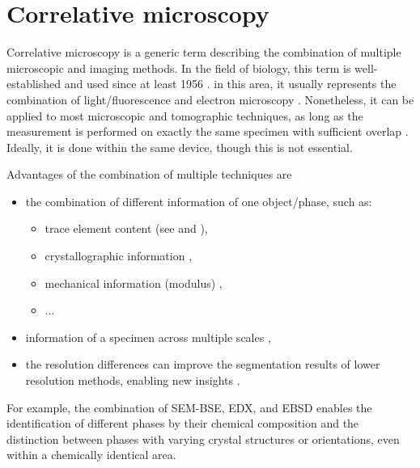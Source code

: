 \FloatBarrier
\section{Correlative microscopy}

Correlative microscopy is a generic term describing the combination of multiple microscopic and imaging methods.
In the field of biology, this term is well-established and used since at least 1956 \cite{bloch.1957}.
in this area, it usually represents the combination of light/fluorescence and electron microscopy \cite{bloch.1957,mironov.2013,loussertfonta.2015}.
Nonetheless, it can be applied to most microscopic and tomographic techniques, as long as the measurement is performed on exactly the same specimen with sufficient overlap \cite{loussertfonta.2015,daly.2017,mitchell.2019,mitchell.2021}.
Ideally, it is done within the same device, though this is not essential.

Advantages of the combination of multiple techniques are
\begin{itemize}
    \item the combination of different information of one object/phase, such as:
    \begin{itemize}
        \item trace element content (see  and \cite{kleiner.2022b}),
        \item crystallographic information \cite{rossler.2022},
        \item mechanical information (modulus) \cite{chen.2010, li.2025, li.2025a},
        \item ...
    \end{itemize}
    \item information of a specimen across multiple scales \cite{daly.2017,mitchell.2019,mitchell.2021,kleiner.2022a},
    \item the resolution differences can improve the segmentation results of lower resolution methods, enabling new insights \cite{kleiner.2022b}.
\end{itemize}


For example, the combination of \ac{SEM}-\ac{BSE}, \ac{EDX}, and \ac{EBSD} enables the identification of different phases by their chemical composition and the distinction between phases with varying crystal structures or orientations, even within a chemically identical area.

